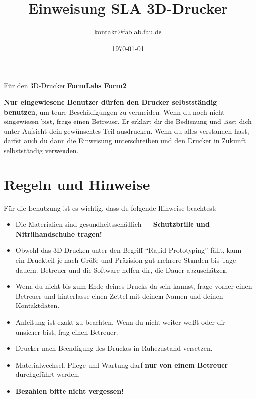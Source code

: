 \documentclass{\basedir/fablab-document}
\date{\today}
\author{kontakt@fablab.fau.de}
\title{Einweisung SLA 3D-Drucker}
\begin{document}
\maketitle
\begin{center}
    Für den 3D-Drucker \textbf{FormLabs Form2}
\end{center}

\textbf{Nur eingewiesene Benutzer dürfen den Drucker selbstständig benutzen}, um teure Beschädigungen zu vermeiden. Wenn du noch nicht eingewiesen bist, frage einen Betreuer. Er erklärt dir die Bedienung und lässt dich unter Aufsicht dein gewünschtes Teil ausdrucken. Wenn du alles verstanden hast, darfst auch du dann die Einweisung unterschreiben und den Drucker in Zukunft selbstständig verwenden.

\section{Regeln und Hinweise}
Für die Benutzung ist es wichtig, dass du folgende Hinweise beachtest:

\begin{itemize}
    \item Die Materialien sind gesundheitsschädlich --- \textbf{Schutzbrille und Nitrilhandschuhe tragen!}
    \item Obwohl das 3D-Drucken unter den Begriff \enquote{Rapid Prototyping} fällt, kann ein Druckteil je nach Größe und
        Präzision gut mehrere Stunden bis Tage dauern. Betreuer und die Software helfen dir, die Dauer abzuschätzen.
    \item Wenn du nicht bis zum Ende deines Drucks da sein kannst, frage vorher einen Betreuer und hinterlasse einen Zettel mit deinem Namen und deinen Kontaktdaten.
    \item Anleitung ist exakt zu beachten. Wenn du nicht weiter weißt oder dir unsicher bist, frag einen Betreuer.
    \item Drucker nach Beendigung des Druckes in Ruhezustand versetzen.
    \item Materialwechsel, Pflege und Wartung darf \textbf{nur von einem Betreuer} durchgeführt werden.
    \item \textbf{Bezahlen bitte nicht vergessen!}
\end{itemize}
\end{document}
